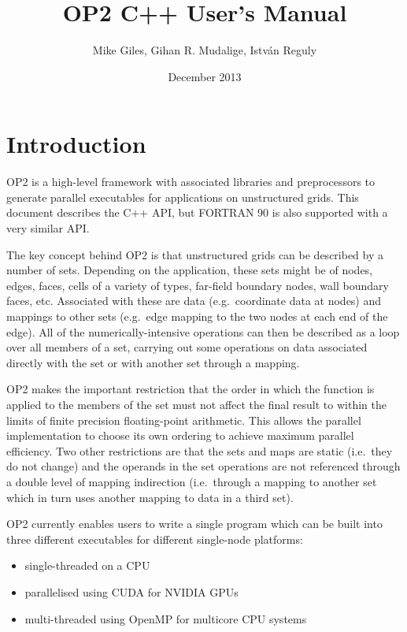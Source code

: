 \documentclass[11pt]{article}
\date{December 2013}
\begin{document}
\title{OP2 C++ User's Manual}
\author{Mike Giles, Gihan R. Mudalige, Istv{\'a}n Reguly}
\maketitle

\newpage




\tableofcontents

\newpage

\newpage
\section{Introduction}

OP2 is a high-level framework with associated libraries and
preprocessors to generate parallel executables for applications
on unstructured grids.  This document describes the C++ API,
but FORTRAN 90 is also supported with a very similar API.

The key concept behind OP2 is that unstructured grids can be
described by a number of sets.  Depending on the application,
these sets might be of nodes, edges, faces, cells of a variety
of types, far-field boundary nodes, wall boundary faces, etc.
Associated with these are data (e.g.~coordinate data at nodes)
and mappings to other sets (e.g.~edge mapping to the two nodes
at each end of the edge).  All of the numerically-intensive
operations can then be described as a loop over all members of
a set, carrying out some operations on data associated directly
with the set or with another set through a mapping.

OP2 makes the important restriction that the order in which the
function is applied to the members of the set must not affect the
final result to within the limits of finite precision floating-point arithmetic.
This allows the parallel implementation to choose
its own ordering to achieve maximum parallel efficiency.
Two other restrictions are that the sets and maps are static
(i.e.~they do not change) and the operands in the set operations
are not referenced through a double level of mapping indirection
(i.e.~through a mapping to another set which in turn uses another
mapping to data in a third set).

OP2 currently enables users to write a single program which can be
built into three different executables for different single-node
platforms:
\begin{itemize}
\item
single-threaded on a CPU
\item
parallelised using CUDA for NVIDIA GPUs
\item
multi-threaded using OpenMP for multicore CPU systems
\end{itemize}
\end{document}
